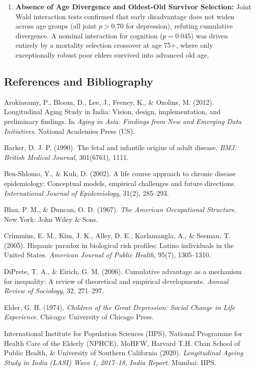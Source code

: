 \begin{enumerate}
    \item \textbf{Absence of Age Divergence and Oldest-Old Survivor Selection:}
    Joint Wald interaction tests confirmed that early disadvantage does not widen across age groups (all joint $p > 0.70$ for depression), refuting cumulative divergence. A nominal interaction for cognition ($p = 0.045$) was driven entirely by a mortality selection crossover at age 75+, where only exceptionally robust poor elders survived into advanced old age.
\end{enumerate}

\subsection{References and Bibliography}

\begin{enumerate}[leftmargin=1.0cm, label={[\arabic*]}]
    \item Arokiasamy, P., Bloom, D., Lee, J., Feeney, K., \& Ozolins, M. (2012). Longitudinal Aging Study in India: Vision, design, implementation, and preliminary findings. In \textit{Aging in Asia: Findings from New and Emerging Data Initiatives}. National Academies Press (US).
    \item Barker, D. J. P. (1990). The fetal and infantile origins of adult disease. \textit{BMJ: British Medical Journal}, 301(6761), 1111.
    \item Ben-Shlomo, Y., \& Kuh, D. (2002). A life course approach to chronic disease epidemiology: Conceptual models, empirical challenges and future directions. \textit{International Journal of Epidemiology}, 31(2), 285--293.
    \item Blau, P. M., \& Duncan, O. D. (1967). \textit{The American Occupational Structure}. New York: John Wiley \& Sons.
    \item Crimmins, E. M., Kim, J. K., Alley, D. E., Karlamangla, A., \& Seeman, T. (2005). Hispanic paradox in biological risk profiles: Latino individuals in the United States. \textit{American Journal of Public Health}, 95(7), 1305--1310.
    \item DiPrete, T. A., \& Eirich, G. M. (2006). Cumulative advantage as a mechanism for inequality: A review of theoretical and empirical developments. \textit{Annual Review of Sociology}, 32, 271--297.
    \item Elder, G. H. (1974). \textit{Children of the Great Depression: Social Change in Life Experience}. Chicago: University of Chicago Press.
    \item International Institute for Population Sciences (IIPS), National Programme for Health Care of the Elderly (NPHCE), MoHFW, Harvard T.H. Chan School of Public Health, \& University of Southern California (2020). \textit{Longitudinal Ageing Study in India (LASI) Wave 1, 2017--18, India Report}. Mumbai: IIPS.

\end{enumerate}
